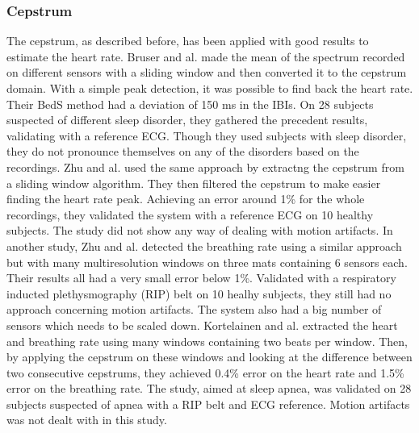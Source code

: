\documentclass[twoside,onecolumn]{article}
\begin{document}
\subsubsection{Cepstrum}
The cepstrum, as described before, has been applied with good results to estimate the heart rate. Bruser and al. \cite{bruser_improvement_2015} made the mean of the spectrum recorded on different sensors with a sliding window and then converted it to the cepstrum domain. With a simple peak detection, it was possible to find back the heart rate. Their BedS method had a deviation of 150 ms in the IBIs. On 28 subjects suspected of different sleep disorder, they gathered the precedent results, validating with a reference ECG. Though they used subjects with sleep disorder, they do not pronounce themselves on any of the disorders based on the recordings.
Zhu and al. \cite{zhu_heart_2014} used the same approach by extractng the cepstrum from a sliding window algorithm. They then filtered the cepstrum to make easier finding the heart rate peak. Achieving an error around 1\% for the whole recordings, they validated the system with a reference ECG on 10 healthy subjects. The study did not show any way of dealing with motion artifacts. In another study, Zhu and al. \cite{zhu_estimating_2015} detected the breathing rate using a similar approach but with many multiresolution windows on three mats containing 6 sensors each. Their results all had a very small error below 1\%. Validated with a respiratory inducted plethysmography (RIP) belt on 10 healhy subjects, they still had no approach concerning motion artifacts. The system also had a big number of sensors which needs to be scaled down.
Kortelainen and al. \cite{kortelainen_multichannel_2012} extracted the heart and breathing rate using many windows containing two beats per window. Then, by applying the cepstrum on these windows and looking at the difference between two consecutive cepstrums, they achieved 0.4\% error on the heart rate and 1.5\% error on the breathing rate. The study, aimed at sleep apnea, was validated on 28 subjects suspected of apnea with a RIP belt and ECG reference. Motion artifacts was not dealt with in this study.
\end{document}
